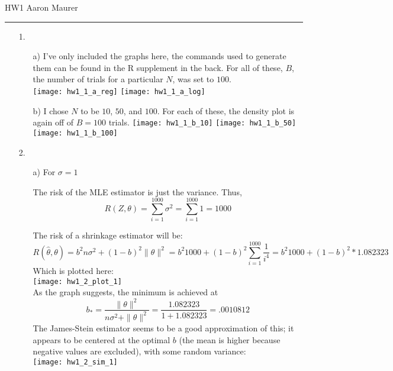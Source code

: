 \documentclass[11pt]{article}
\theoremstyle{definition}
\begin{document}
HW1 \hfill Aaron Maurer
\vspace{2mm}
\hrule
\vspace{2mm}
\begin{itemize}
    \item[1.]
        \begin{itemize}
            \item[a)]
                I've only included the graphs here, the commands used to generate them can be found in the R supplement in the back. For all of these, $B$, the number of trials for a particular $N$, was set to $100$. \\
                \texttt{[image: hw1\_1\_a\_reg]} 
                \texttt{[image: hw1\_1\_a\_log]} 
            \item[b)]
                I chose $N$ to be $10$, $50$, and $100$. For each of these, the density plot is again off of $B=100$ trials.
                \texttt{[image: hw1\_1\_b\_10]} 
                \texttt{[image: hw1\_1\_b\_50]} \\
                \texttt{[image: hw1\_1\_b\_100]} 
        \end{itemize}
    \item[2.]
        \begin{itemize}
            \item[a)]
                For $\sigma=1$
                \smallskip

                The risk of the MLE estimator is just the variance. Thus,
                \[ R(Z,\theta) = \sum_{i=1}^{1000} \sigma^2 = \sum_{i=1}^{1000} 1 = 1000 \]

                The risk of a shrinkage estimator will be:
                \[ R(\hat\theta,\theta) = b^2n\sigma^2 + (1-b)^2 \| \theta \|^2 = b^2 1000 + (1-b)^2 \sum_{i=1}^{1000} \frac{1}{i^4} = b^2 1000 + (1-b)^2*1.082323 \]
                Which is plotted here: \\
                \texttt{[image: hw1\_2\_plot\_1]} \\
                As the graph suggests, the minimum is achieved at
                \[b_*=\frac{\|\theta \|^2}{n\sigma^2+\|\theta \|^2} = \frac{1.082323}{1+1.082323} = .0010812 \]
                The James-Stein estimator seems to be a good approximation of this; it appears to be centered at the optimal $b$ (the mean is higher because negative values are excluded), with some random variance: \\
                \texttt{[image: hw1\_2\_sim\_1]} \\


\end{itemize}
\end{itemize}
\end{document}
